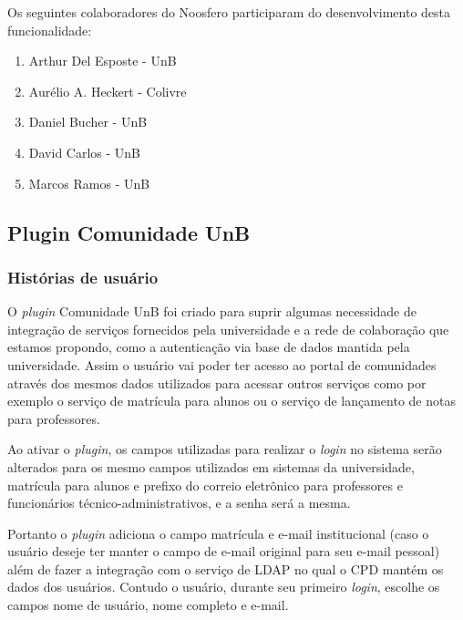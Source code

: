 Os seguintes colaboradores do Noosfero participaram do desenvolvimento desta
funcionalidade:

\begin{enumerate}

\item Arthur Del Esposte - UnB

\item Aurélio A. Heckert - Colivre

\item Daniel Bucher - UnB

\item David Carlos - UnB

\item Marcos Ramos - UnB

\end{enumerate}

\subsection{Plugin Comunidade UnB}

\subsubsection*{Histórias de usuário}

O \textit{plugin} Comunidade UnB foi criado para suprir algumas necessidade de
integração de serviços fornecidos pela universidade e a rede de colaboração que
estamos propondo, como a autenticação via base de dados mantida pela universidade.
Assim o usuário vai poder ter acesso ao portal de comunidades através dos mesmos
dados utilizados para acessar outros serviços como por exemplo o serviço de
matrícula para alunos ou o serviço de lançamento de notas para professores.

Ao ativar o \textit{plugin}, os campos utilizadas para realizar o \textit{login}
no sistema serão alterados para os mesmo campos utilizados em sistemas da
universidade, matrícula para alunos e prefixo do correio eletrônico para
professores e funcionários técnico-administrativos, e a senha será a mesma.

Portanto o \textit{plugin} adiciona o campo matrícula e e-mail institucional
(caso o usuário deseje ter manter o campo de e-mail original para seu e-mail
pessoal) além de fazer a integração com o serviço de LDAP no qual o CPD mantém
os dados dos usuários. Contudo o usuário, durante seu primeiro \textit{login},
escolhe os campos nome de usuário, nome completo e e-mail.

